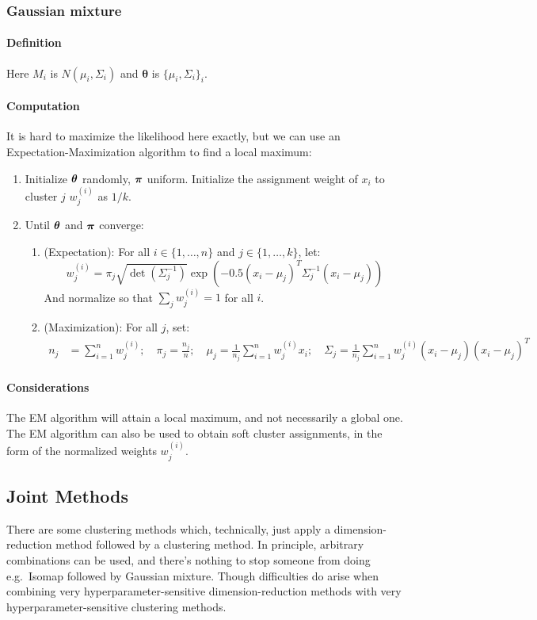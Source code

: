 \documentclass[12pt,a4paper]{article}
\newcommand{\1}[1]{\mathds{1}\left[#1\right]}
\newcommand{\inv}{^{-1}}
\begin{document}
\subsubsection{Gaussian mixture}
\paragraph{Definition} Here $M_i$ is $N(\mu_i,\Sigma_i)$ and $\boldsymbol \theta$ is $\{\mu_i,\Sigma_i\}_i$.
\paragraph{Computation} It is hard to maximize the likelihood here exactly, but we can use an Expectation-Maximization algorithm to find a local maximum:
\begin{enumerate}
    \item Initialize $\boldsymbol\theta$ randomly, $\boldsymbol\pi$ uniform. Initialize the assignment weight of $x_i$ to cluster $j$ $w_j^{(i)}$ as $1/k$.
    \item Until $\boldsymbol\theta$ and $\boldsymbol\pi$ converge:
        \begin{enumerate}
            \item (Expectation): For all $i\in \{1,\ldots, n\}$ and $j\in \{1,\ldots, k\}$, let:
                \[w_j^{(i)}=\pi_j\sqrt{\det(\Sigma_j\inv)}\exp\left(-0.5(x_i-\mu_j)^T\Sigma_j\inv(x_i-\mu_j)\right)\]
                And normalize so that $\sum_{j} w_j^{(i)}=1$ for all $i$.
            \item (Maximization): For all $j$, set:
                \begin{align*}
                    n_j &= \sum_{i=1}^nw_j^{(i)};\quad 
                    \pi_j = \frac{n_j}n;\quad 
                    \mu_j = \frac{1}{n_j}\sum_{i=1}^nw_j^{(i)}x_i;\quad
                    \Sigma_j  =\frac{1}{n_j}\sum_{i=1}^nw_j^{(i)}(x_i-\mu_j)(x_i-\mu_j)^T
                \end{align*}
        \end{enumerate}
\end{enumerate}

\paragraph{Considerations} The EM algorithm will attain a local maximum, and not necessarily a global one. The EM algorithm can also be used to obtain soft cluster assignments, in the form of the normalized weights $w_j^{(i)}$.

\subsection{Joint Methods}
There are some clustering methods which, technically, just apply a dimension-reduction method followed by a clustering method. In principle, arbitrary combinations can be used, and there's nothing to stop someone from doing e.g.~Isomap followed by Gaussian mixture. Though difficulties do arise when combining very hyperparameter-sensitive dimension-reduction methods with very hyperparameter-sensitive clustering methods.
\end{document}
